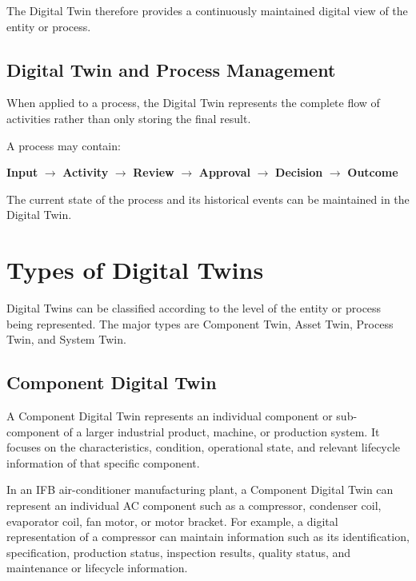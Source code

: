 \documentclass[12pt,a4paper]{article}
\begin{document}
The Digital Twin therefore provides a continuously maintained
digital view of the entity or process.

\subsection{Digital Twin and Process Management}

When applied to a process, the Digital Twin represents the complete
flow of activities rather than only storing the final result.

A process may contain:

\begin{center}
\textbf{Input}
$\rightarrow$
\textbf{Activity}
$\rightarrow$
\textbf{Review}
$\rightarrow$
\textbf{Approval}
$\rightarrow$
\textbf{Decision}
$\rightarrow$
\textbf{Outcome}
\end{center}

The current state of the process and its historical events can be
maintained in the Digital Twin.


\section{Types of Digital Twins}

Digital Twins can be classified according to the level of the
entity or process being represented. The major types are Component
Twin, Asset Twin, Process Twin, and System Twin.

\subsection{Component Digital Twin}

A Component Digital Twin represents an individual component or sub-component of a larger industrial product, machine, or production system. It focuses on the characteristics, condition, operational state, and relevant lifecycle information of that specific component.

In an IFB air-conditioner manufacturing plant, a Component Digital Twin can represent an individual AC component such as a compressor, condenser coil, evaporator coil, fan motor, or motor bracket. For example, a digital representation of a compressor can maintain information such as its identification, specification, production status, inspection results, quality status, and maintenance or lifecycle information.
\end{document}
